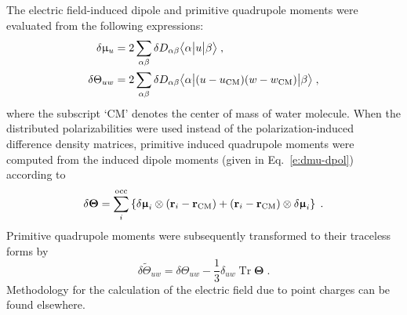 \documentclass[aip,jcp,preprint,amsmath,amssymb,floatfix]{revtex4-1}
\newcommand{\tbraket}[3]{\ensuremath{\bigl\langle {#1} \bigl\lvert {#2} \bigl\lvert {#3} \bigr\rangle}}
\newcommand{\BM}[1]{\bm{#1}}
\DeclareMathOperator{\Tr}{Tr}
\begin{document}
The electric field\hyp{}induced dipole and primitive quadrupole moments were evaluated from the following expressions:
%
\begin{subequations}\label{e:dmult}
  \begin{align}
   \delta \upmu_{u}   &= 2\sum_{\alpha\beta} \delta D_{\alpha\beta} \tbraket{\alpha}{u}{\beta}  \;,\\
   \delta \Theta_{uw} &= 2\sum_{\alpha\beta} \delta D_{\alpha\beta} \tbraket{\alpha}{(u-u_{\rm CM})(w-w_{\rm CM})}{\beta} \;, 
  \end{align}
\end{subequations}
%
where the subscript `CM' denotes the center of mass of water molecule.
When the distributed polarizabilities were used instead of the polarization\hyp{}induced 
difference density matrices, primitive induced quadrupole moments were computed from
the induced dipole moments (given in Eq.~\eqref{e:dmu-dpol}) according to
%
\begin{equation}\label{e:dTheta-dpol}
  \delta {\BM \Theta} = \sum_i^{\rm occ} 
   \left\{ 
       \delta {\BM \upmu}_i \otimes \left( {\bf r}_i - {\bf r}_{\rm CM} \right) 
      + \left( {\bf r}_i - {\bf r}_{\rm CM} \right) \otimes \delta {\BM \upmu}_i
   \right\} \;.
\end{equation}
%
Primitive quadrupole moments were subsequently transformed to their traceless forms by
%
\begin{equation}
  \delta \widetilde{\Theta}_{uw} = \delta \Theta_{uw} - \frac{1}{3} \delta_{uw} \Tr{\BM\Theta} \;.
\end{equation}
%
Methodology for the calculation of the electric field due to point charges
can be found elsewhere.\cite{Blasiak.Cho.JCP.2014}
\end{document}

